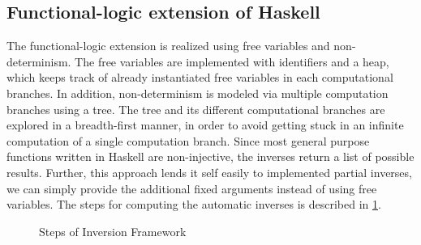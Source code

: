 \documentclass[12pt,a4paper, dvipsnames,usenames]{article}
\begin{document}
\subsection{Functional-logic extension of Haskell}

The functional-logic extension is realized using free variables and non-determinism.
The free variables are implemented with
identifiers and a heap, which keeps track of already
instantiated free variables in each computational branches.
In addition, non-determinism is modeled via multiple computation branches
using a tree. The tree and its different computational
branches are explored in a breadth-first manner, in order to avoid getting
stuck in an infinite computation of a single computation branch.
Since most general purpose functions written in Haskell are non-injective,
the inverses return a list of possible results.
Further, this approach lends it self easily to implemented partial inverses,
we can simply provide the additional fixed arguments instead of using free variables.
The steps for computing the automatic inverses is described in
\cref{fig:inversion-steps}.

\begin{figure}[h]

\caption{Steps of Inversion Framework}
\label{fig:inversion-steps}
\end{figure}
\end{document}
